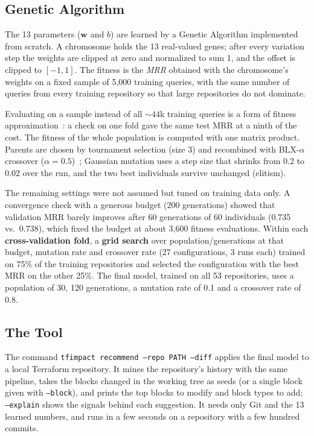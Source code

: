 \subsection{Genetic Algorithm}
The 13 parameters ($\mathbf{w}$ and $b$) are learned by a Genetic Algorithm implemented from
scratch. A chromosome holds the 13 real-valued genes; after every variation step the
weights are clipped at zero and normalized to sum 1, and the offset is clipped to $[-1, 1]$. The
fitness is the \emph{MRR} obtained with the chromosome's weights on a fixed sample of 5,000 training
queries, with the same number of queries from every training repository so that large
repositories do not dominate.

Evaluating on a sample instead of all ${\sim}44$k training queries is
a form of fitness approximation~\cite{jin2005fitness}: a check on one fold gave the same test MRR
at a ninth of the cost. The fitness of the whole population is computed with one matrix product.
Parents are chosen by tournament selection (size 3) and recombined with BLX-$\alpha$ crossover
($\alpha = 0.5$)~\cite{eshelman1993blx}; Gaussian mutation uses a step size that shrinks from 0.2
to 0.02 over the run, and the two best individuals survive unchanged (elitism).

The remaining settings were not assumed but tuned on training data only. A convergence check with
a generous budget (200 generations) showed that validation MRR barely improves after 60 generations
of 60 individuals (0.735 vs.\ 0.738), which fixed the budget at about 3,600 fitness evaluations. Within each \textbf{cross-validation fold}, a \textbf{grid search} over population/generations at that budget, mutation rate and crossover rate (27 configurations, 3 runs each) trained on 75\% of the training repositories and selected the
configuration with the best MRR on the other 25\%. The final model, trained on all 53 repositories,
uses a population of 30, 120 generations, a mutation rate of 0.1 and a crossover rate of 0.8.

\subsection{The \tool{} Tool}
The command \texttt{tfimpact recommend --repo PATH --diff} applies the final model to a local
Terraform repository. It mines the repository's history with the same pipeline, takes the blocks
changed in the working tree as seeds (or a single block given with \texttt{--block}), and prints
the top blocks to modify and block types to add; \texttt{--explain} shows the signals behind each
suggestion. It needs only Git and the 13 learned numbers, and runs in a few seconds on a
repository with a few hundred commits.

